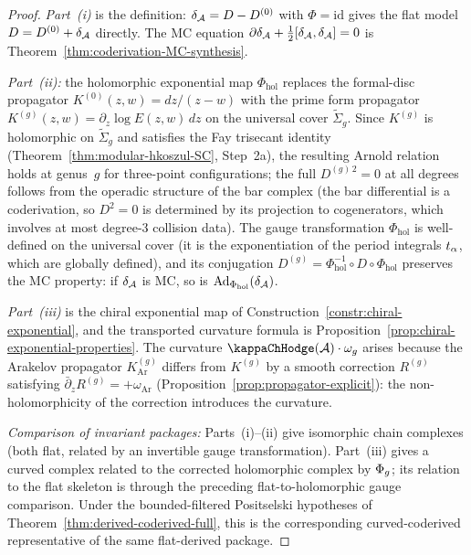 \begin{proof}
\emph{Part~(i)} is the definition: $\delta_{\mathcal{A}} = D - D^{(0)}$ with
$\Phi = \mathrm{id}$ gives the flat model $D = D^{(0)} + \delta_{\mathcal{A}}$
directly. The MC equation $\partial\delta_{\mathcal{A}} + \frac{1}{2}[\delta_{\mathcal{A}},
\delta_{\mathcal{A}}] = 0$ is Theorem~\ref{thm:coderivation-MC-synthesis}.

\emph{Part~(ii):} the holomorphic exponential map
$\Phi_{\mathrm{hol}}$ replaces the formal-disc propagator
$K^{(0)}(z,w) = dz/(z-w)$ with the prime form propagator
$K^{(g)}(z,w) = \partial_z \log E(z,w)\,dz$ on the universal cover
$\widetilde{\Sigma}_g$. Since $K^{(g)}$ is holomorphic on
$\widetilde{\Sigma}_g$ and satisfies the Fay trisecant identity
(Theorem~\ref{thm:modular-hkoszul-SC}, Step~2a), the resulting
Arnold relation holds at genus~$g$ for three-point configurations;
the full $D^{(g)\,2} = 0$ at all degrees follows from the operadic
structure of the bar complex (the bar differential is a coderivation,
so $D^2 = 0$ is determined by its projection to cogenerators, which
involves at most degree-$3$ collision data). The gauge transformation $\Phi_{\mathrm{hol}}$
is well-defined on the universal cover
(it is the exponentiation of the period integrals $t_\alpha$,
which are globally defined), and its conjugation
$D^{(g)} = \Phi_{\mathrm{hol}}^{-1} \circ D \circ \Phi_{\mathrm{hol}}$
preserves the MC property: if $\delta_{\mathcal{A}}$ is MC, so is
$\operatorname{Ad}_{\Phi_{\mathrm{hol}}}(\delta_{\mathcal{A}})$.

\emph{Part~(iii)} is the chiral exponential map of
Construction~\ref{constr:chiral-exponential}, and the transported
curvature formula is
Proposition~\ref{prop:chiral-exponential-properties}.
The curvature $\kappaChHodge(\cA) \cdot \omega_g$ arises because the
Arakelov propagator $K^{(g)}_{\mathrm{Ar}}$ differs from $K^{(g)}$
by a smooth correction $R^{(g)}$ satisfying
$\bar\partial_z R^{(g)} = +\omega_{\mathrm{Ar}}$
(Proposition~\ref{prop:propagator-explicit}): the non-holomorphicity
of the correction introduces the curvature.

\emph{Comparison of invariant packages:} Parts~(i)--(ii) give isomorphic
chain complexes (both flat, related by an invertible gauge
transformation). Part~(iii) gives a curved complex related to the
corrected holomorphic complex by $\Phi_g$; its relation to the
flat skeleton is through the preceding flat-to-holomorphic gauge
comparison. Under the bounded-filtered Positselski hypotheses of
Theorem~\ref{thm:derived-coderived-full}, this is the corresponding
curved-coderived representative of the same flat-derived package.
\end{proof}

